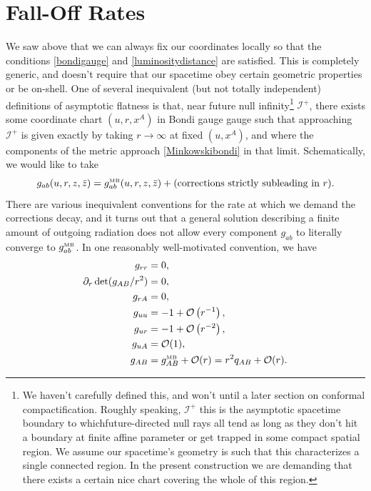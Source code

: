 \documentclass[11pt,letterpaper]{article}
\newcommand{\LP}{\left(}
\newcommand{\RP}{\right)}
\newcommand{\mc}[1]{\mathcal{#1}}
\newcommand{\D}{\partial}
\begin{document}
\section{Fall-Off Rates}
We saw above that we can always fix our coordinates locally so that the conditions \eqref{bondigauge} and \eqref{luminositydistance} are satisfied. This is completely generic, and doesn't require that our spacetime obey certain geometric properties or be on-shell. One of several inequivalent (but not totally independent) definitions of asymptotic flatness is that, near future null infinity\footnote{We haven't carefully defined this, and won't until a later section on conformal compactification. Roughly speaking, $\mc{I}^+$ this is the asymptotic spacetime boundary to whichfuture-directed null rays all tend as long as they don't hit a boundary at finite affine parameter or get trapped in some compact spatial region. We assume our spacetime's geometry is such that this characterizes a single connected region. In the present construction we are demanding that there exists a certain nice chart covering the whole of this region.} $\mc{I}^+$, there exists some coordinate chart $(u,r, x^A)$ in Bondi gauge gauge such that approaching $\mc{I}^+$ is given exactly by taking $r \to \infty$ at fixed $(u, x^A)$, and where the components of the metric approach \eqref{Minkowskibondi} in that limit. Schematically, we would like to take \begin{equation}
g_{ab}(u, r, z, \bar{z}) = g_{ab}^{\mbox{\tiny{MB}}}(u, r, z, \bar{z}) + \mbox{(corrections strictly subleading in $r$)}.
\end{equation}
There are various inequivalent conventions for the rate at which we demand the corrections decay, and it turns out that a general solution describing a finite amount of outgoing radiation does not allow every component $g_{ab}$ to literally converge to $g_{ab}^{\mbox{\tiny{MB}}}$. In one reasonably well-motivated convention, we have \begin{equation}
\begin{aligned}
g_{rr} & = 0, \\
\D_r \det (g_{AB} / r^2) & = 0, \\
g_{rA} & = 0, \\
g_{uu} & = -1 + \mc{O} \LP r^{-1} \RP, \\
g_{ur} & = -1 + \mc{O} \LP r^{-2} \RP, \\
g_{uA} & = \mc{O}(1), \\
g_{AB} & =  g_{AB}^{\mbox{\tiny{MB}}} + \mc{O}(r) = r^2 q_{AB} + \mc{O}(r).
\end{aligned}
\end{equation}
\end{document}
